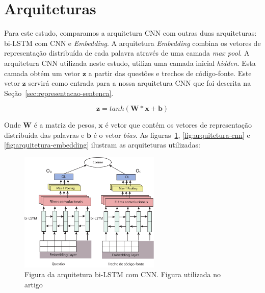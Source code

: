 \section{Arquiteturas}

Para este estudo, comparamos a arquitetura CNN com outras duas arquiteturas: bi-LSTM com CNN e \textit{Embedding}. A arquitetura \textit{Embedding} combina os vetores de representação distribuída de cada palavra através de uma camada \textit{max pool}. A arquitetura CNN utilizada neste estudo, utiliza uma camada inicial \textit{hidden}.
Esta camada obtém um vetor $\bm{z}$ a partir das questões e trechos de código-fonte. Este vetor $\bm{z}$ servirá como entrada para a nossa arquitetura CNN que foi descrita na Seção~\ref{sec:representacao-sentenca}.

\begin{equation}
    \bm{z} = tanh(\bm{W} * \bm{x} + \bm{b})
\end{equation}

Onde $\bm{W}$ é a matriz de pesos, $\bm{x}$ é vetor que contém os vetores de representação distribuída das palavras e $\bm{b}$ é o vetor \textit{bias}. As figuras~\ref{fig:arquitetura-bi-lstm-com-cnn}, \ref{fig:arquitetura-cnn} e \ref{fig:arquitetura-embedding} ilustram as arquiteturas utilizadas:

\begin{figure}[h]
    \centering
    \includegraphics[width=0.6\textwidth]{figuras/cap-resultados-preliminares/ArquiteturaBiLSTM.pdf}
    \caption{Figura da arquitetura bi-LSTM com CNN. Figura utilizada no artigo \cite{marcelo-vem-2019}}
    \label{fig:arquitetura-bi-lstm-com-cnn}
\end{figure}

